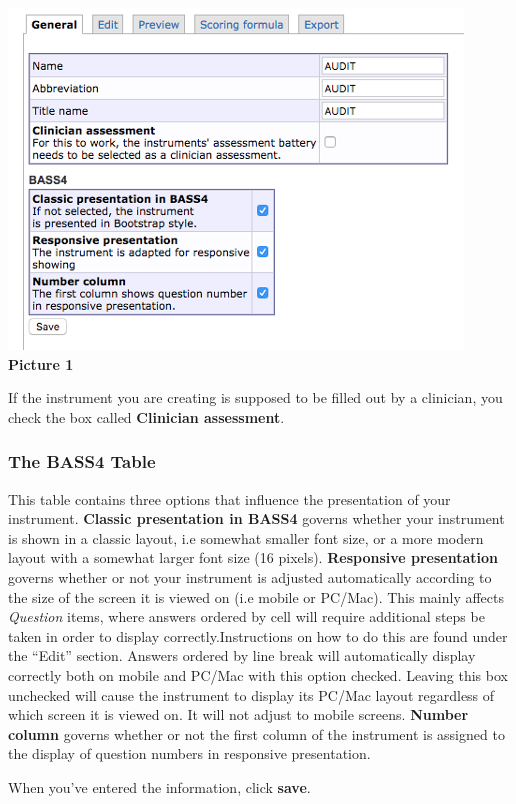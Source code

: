 \documentclass[]{book}
\begin{document}
\includegraphics{images/new-images/InstrumentsGeneral1.png}
\textbf{Picture 1}

If the instrument you are creating is supposed to be filled out by a clinician, you check the box called \textbf{Clinician assessment}.

\hypertarget{the-bass4-table}{%
\subsubsection{The BASS4 Table}\label{the-bass4-table}}

This table contains three options that influence the presentation of your instrument.
\textbf{Classic presentation in BASS4} governs whether your instrument is shown in a classic layout, i.e somewhat smaller font size, or a more modern layout with a somewhat larger font size (16 pixels).
\textbf{Responsive presentation} governs whether or not your instrument is adjusted automatically according to the size of the screen it is viewed on (i.e mobile or PC/Mac). This mainly affects \emph{Question} items, where answers ordered by cell will require additional steps be taken in order to display correctly.Instructions on how to do this are found under the ``Edit'' section.
Answers ordered by line break will automatically display correctly both on mobile and PC/Mac with this option checked.
Leaving this box unchecked will cause the instrument to display its PC/Mac layout regardless of which screen it is viewed on. It will not adjust to mobile screens.
\textbf{Number column} governs whether or not the first column of the instrument is assigned to the display of question numbers in responsive presentation.

When you've entered the information, click \textbf{save}.
\end{document}
